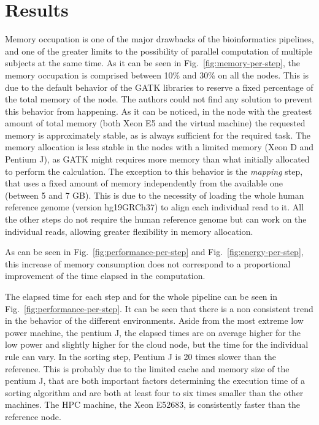 \documentclass{standalone}
\begin{document}
\section*{Results}

Memory occupation is one of the major drawbacks of the bioinformatics pipelines, and one of the greater limits to the possibility of parallel computation of multiple subjects at the same time.
As it can be seen in Fig.~\ref{fig:memory-per-step}, the memory occupation is comprised between 10\% and 30\% on all the nodes.
This is due to the default behavior of the GATK libraries to reserve a fixed percentage of the total memory of the node.
The authors could not find any solution to prevent this behavior from happening.
As it can be noticed, in the node with the greatest amount of total memory (both Xeon E5 and the virtual machine) the requested memory is approximately stable, as is always sufficient for the required task.
The memory allocation is less stable in the nodes with a limited memory (Xeon D and Pentium J), as GATK might requires more memory than what initially allocated to perform the calculation.
The exception to this behavior is the \emph{mapping} step, that uses a fixed amount of memory independently from the available one (between 5 and 7 GB).
This is due to the necessity of loading the whole human reference genome (version hg19GRCh37) to align each individual read to it.
All the other steps do not require the human reference genome but can work on the individual reads, allowing greater flexibility in memory allocation.

As can be seen in Fig.~\ref{fig:performance-per-step} and Fig.~\ref{fig:energy-per-step}, this increase of memory consumption does not correspond to a proportional improvement of the time elapsed in the computation.

The elapsed time for each step and for the whole pipeline can be seen in Fig.~\ref{fig:performance-per-step}.
It can be seen that there is a non consistent trend in the behavior of the different environments.
Aside from the most extreme low power machine, the pentium J, the elapsed times are on average higher for the low power and slightly higher for the cloud node, but the time for the individual rule can vary.
In the sorting step, Pentium J is 20 times slower than the reference.
This is probably due to the limited cache and memory size of the pentium J, that are both important factors determining the execution time of a sorting algorithm and are both at least four to six times smaller than the other machines.
The HPC machine, the Xeon E52683, is consistently faster than the reference node.
\end{document}
